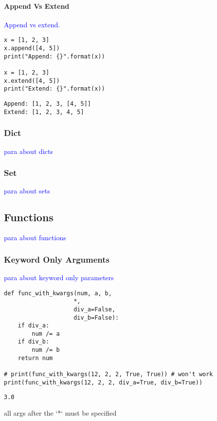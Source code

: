 \paragraph{Append Vs Extend}

\textcolor{blue}{Append vs extend.}

\begin{lstlisting}[style=pyInStyle]
x = [1, 2, 3]
x.append([4, 5])
print("Append: {}".format(x))

x = [1, 2, 3]
x.extend([4, 5])
print("Extend: {}".format(x))
\end{lstlisting}
\begin{lstlisting}[style=pyOutStyle]
Append: [1, 2, 3, [4, 5]]
Extend: [1, 2, 3, 4, 5]
\end{lstlisting}


\subsubsection{Dict}

\textcolor{blue}{para about dicts}

\subsubsection{Set}

\textcolor{blue}{para about sets}

\subsection{Functions}

\textcolor{blue}{para about functions}

\subsubsection{Keyword Only Arguments}

\textcolor{blue}{para about keyword only parameters}

\begin{lstlisting}[style=pyInStyle]
def func_with_kwargs(num, a, b,
                    *,
                    div_a=False,
                    div_b=False):
    if div_a:
        num /= a
    if div_b:
        num /= b
    return num

# print(func_with_kwargs(12, 2, 2, True, True)) # won't work
print(func_with_kwargs(12, 2, 2, div_a=True, div_b=True))
\end{lstlisting}
\begin{lstlisting}[style=pyOutStyle]
3.0
\end{lstlisting}
\begin{markdown}
all args after the `*` must be specified
\end{markdown}


